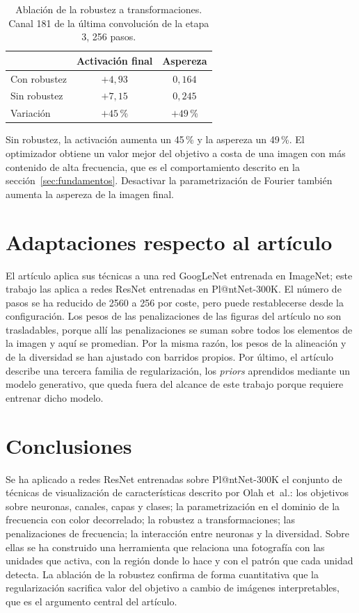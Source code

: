 \documentclass[11pt,a4paper]{article}
\begin{document}
\begin{table}[!htb]
\centering\small
\caption{Ablación de la robustez a transformaciones. Canal 181 de la última
convolución de la etapa 3, 256 pasos.}
\label{tab:robustez}
\begin{tabular}{l c c}
\toprule
 & \textbf{Activación final} & \textbf{Aspereza} \\
\midrule
Con robustez & $+4{,}93$ & $0{,}164$ \\
Sin robustez & $+7{,}15$ & $0{,}245$ \\
\midrule
Variación & $+45$\,\% & $+49$\,\% \\
\bottomrule
\end{tabular}
\end{table}

Sin robustez, la activación aumenta un 45\,\% y la aspereza un 49\,\%. El
optimizador obtiene un valor mejor del objetivo a costa de una imagen con
más contenido de alta frecuencia, que es el comportamiento descrito en la
sección~\ref{sec:fundamentos}. Desactivar la parametrización de Fourier
también aumenta la aspereza de la imagen final.

\section{Adaptaciones respecto al artículo}

El artículo aplica sus técnicas a una red GoogLeNet entrenada en ImageNet;
este trabajo las aplica a redes ResNet entrenadas en Pl@ntNet-300K. El número
de pasos se ha reducido de 2560 a 256 por coste, pero puede restablecerse desde
la configuración. Los pesos de las penalizaciones de las figuras del
artículo no son trasladables, porque allí las penalizaciones se suman sobre
todos los elementos de la imagen y aquí se promedian. Por la misma razón,
los pesos de la alineación y de la diversidad se han ajustado con barridos
propios. Por último, el artículo describe una tercera familia de
regularización, los \emph{priors} aprendidos mediante un modelo generativo,
que queda fuera del alcance de este trabajo porque requiere entrenar dicho
modelo.

\section{Conclusiones}

Se ha aplicado a redes ResNet entrenadas sobre Pl@ntNet-300K el conjunto de
técnicas de visualización de características descrito por Olah et~al.: los
objetivos sobre neuronas, canales, capas y clases; la parametrización en el
dominio de la frecuencia con color decorrelado; la robustez a
transformaciones; las penalizaciones de frecuencia; la interacción entre
neuronas y la diversidad. Sobre ellas se ha construido una herramienta que
relaciona una fotografía con las unidades que activa, con la región donde lo
hace y con el patrón que cada unidad detecta. La ablación de la robustez
confirma de forma cuantitativa que la regularización sacrifica valor del
objetivo a cambio de imágenes interpretables, que es el argumento central
del artículo.
\end{document}
